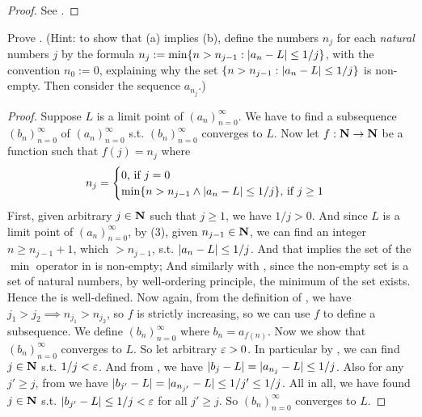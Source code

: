 \begin{proof}
See .
\end{proof}

\begin{exercise} \label{exercise 6.6.5}
Prove .
(Hint: to show that (a) implies (b), define the numbers \(n_j\) for each \emph{natural} numbers \(j\) by the formula \(n_j := \min \{ n > n_{j - 1} : \lvert a_n - L\rvert \le 1/j \} \), with the convention \(n_0 := 0\),
explaining why the set \(\{ n > n_{j - 1} : \lvert a_n - L\rvert \le 1/j \}\) is non-empty.
Then consider the sequence \(a_{n_j}\).)
\end{exercise}

\begin{proof}
Suppose \(L\) is a limit point of \((a_n)_{n = 0}^{\infty}\).
We have to find a subsequence \((b_n)_{n = 0}^{\infty}\) of \((a_n)_{n = 0}^{\infty}\) s.t. \((b_n)_{n = 0}^{\infty}\) converges to \(L\).
Now let \(f: \mathbf{N} \rightarrow \mathbf{N}\) be a function such that \(f(j) = n_j\) where
\begin{equation} \label{eq 6.3}
    n_j = 
    \begin{cases}
        0 \text{, if } j = 0 \\
        \min\{n > n_{j - 1} \land \lvert a_n - L \rvert \le 1/j\} \text{, if } j \ge 1
    \end{cases}
\end{equation}
First, given arbitrary \(j \in \mathbf{N}\) such that \(j \ge 1\), we have \(1/j > 0\).
And since \(L\) is a limit point of \((a_n)_{n = 0}^{\infty}\),
by (3), given \(n_{j - 1} \in \mathbf{N}\), we can find an integer \(n \ge n_{j - 1} + 1\), which \(> n_{j - 1}\), s.t. \(\lvert a_n - L\rvert \le 1/j\).
And that implies the set of the \(\min\) operator in  is non-empty;
And similarly with , since the non-empty set is a set of natural numbers, by well-ordering principle, the minimum of the set exists.
Hence the  is well-defined.
Now again, from the definition of , we have \(j_1 > j_2 \implies n_{j_1} > n_{j_2}\), so \(f\) is strictly increasing, so we can use \(f\) to define a subsequence.
We define \((b_n)_{n = 0}^{\infty}\) where \(b_n = a_{f(n)}\).
Now we show that \((b_n)_{n = 0}^{\infty}\) converges to \(L\).
So let arbitrary \(\varepsilon > 0\).
In particular by , we can find \(j \in \mathbf{N}\) s.t. \(1/j < \varepsilon\).
And from , we have \(\lvert b_j - L\rvert = \lvert a_{n_j} - L\rvert \le 1/j\).
Also for any \(j' \ge j\), from  we have \(\lvert b_{j'} - L\rvert = \lvert a_{n_{j'}} - L\rvert \le 1/{j'} \le 1/{j}\).
All in all, we have found \(j \in \mathbf{N}\) s.t. \(\lvert b_{j'} - L\rvert \le 1/j < \varepsilon\) for all \(j' \ge j\).
So \((b_n)_{n = 0}^{\infty}\) converges to \(L\).


\end{proof}
